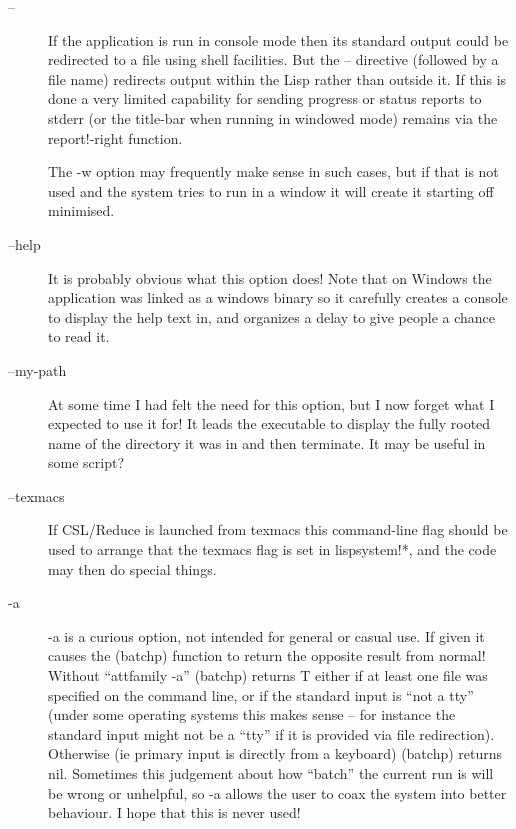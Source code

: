 \documentclass[a4paper,11pt]{article}
\begin{document}
\begin{description} 

\item [{\ttfamily --}]
If the application is run in console mode then its standard output could
be redirected to a file using shell facilities. But the {\ttfamily --}
directive (followed by a file name) redirects output within the Lisp rather
than outside it. If this is done a very limited capability for sending
progress or status reports to stderr (or the title-bar when running in windowed
mode) remains via the {\ttfamily report!-right} function.
  
The {\ttfamily -w} option may frequently make sense in such cases, but if that
is not used and the system tries to run in a window it will create it
starting off minimised.

\item [{\ttfamily --help}]
It is probably obvious what this option does! Note that on Windows the
application was linked as a windows binary so it carefully creates a
console to display the help text in, and organizes a delay to give
people a chance to read it.

\item [{\ttfamily --my-path}]
At some time I had felt the need for this option, but I now forget what I
expected to use it for! It leads the executable to display the fully
rooted name of the directory it was in and then terminate. It may be useful
in some script?

\item [{\ttfamily --texmacs}]
If CSL/Reduce is launched from texmacs this command-line flag should be
used to arrange that the {\ttfamily texmacs} flag is set in
{\ttfamily lispsystem!*}, and the code may then do special things.

\item [{\ttfamily -a}]
{\ttfamily -a} is a curious option, not intended for general or casual use.
If given it causes the {\ttfamily (batchp)} function to return the opposite
result from normal!  Without ``{attfamily -a}'' {\ttfamily (batchp)} returns
{\ttfamily T} either if at least one file was specified on the command line,
or if the standard input is ``not a tty'' (under some operating systems this
makes sense -- for instance the standard input might not be a ``tty'' if it
is provided via file redirection).  Otherwise (ie primary input is directly
from a keyboard) {\ttfamily (batchp)} returns {\ttfamily nil}.  Sometimes
this judgement about how ``batch'' the current run is will be wrong or
unhelpful, so {\ttfamily -a} allows the user to coax the system into better
behaviour.  I hope that this is never used!


\end{description}
\end{document}

